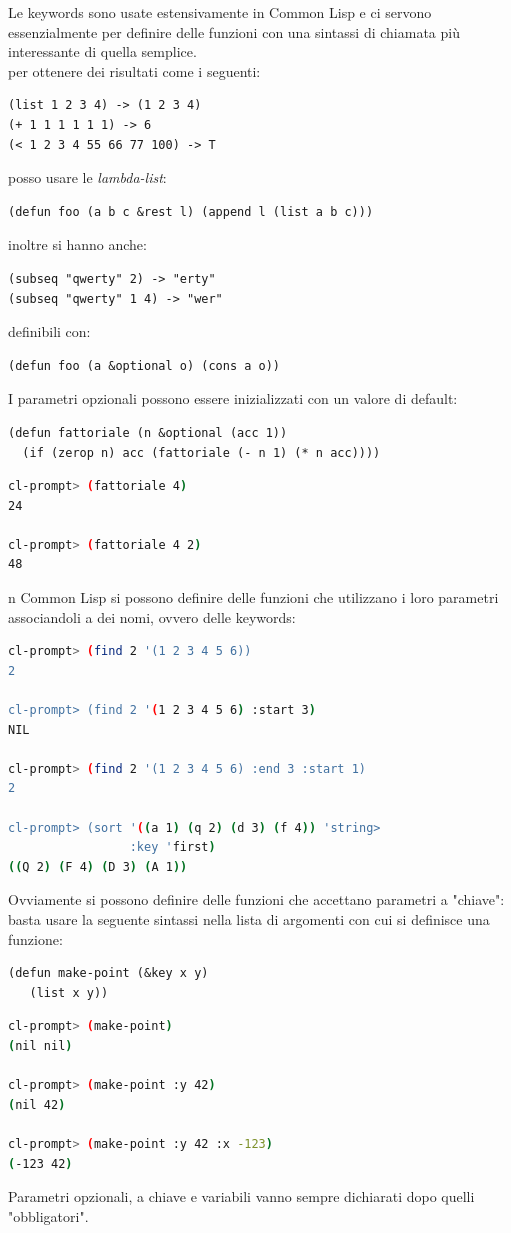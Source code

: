\documentclass[a4paper,12pt, oneside]{book}
\begin{document}
Le keywords sono usate estensivamente in Common Lisp e ci
servono essenzialmente per definire delle funzioni con una
sintassi di chiamata più interessante di quella semplice.\\
per ottenere dei risultati come i seguenti:
\begin{verbatim}
(list 1 2 3 4) -> (1 2 3 4)
(+ 1 1 1 1 1 1) -> 6
(< 1 2 3 4 55 66 77 100) -> T
\end{verbatim}
posso usare le \textit{lambda-list}:
\begin{verbatim}
(defun foo (a b c &rest l) (append l (list a b c)))
\end{verbatim}
inoltre si hanno anche:
\begin{verbatim}
(subseq "qwerty" 2) -> "erty"
(subseq "qwerty" 1 4) -> "wer"
\end{verbatim}
definibili con:
\begin{verbatim}
(defun foo (a &optional o) (cons a o))
\end{verbatim}
I parametri opzionali possono essere inizializzati con un valore di default:
\begin{verbatim}
(defun fattoriale (n &optional (acc 1))
  (if (zerop n) acc (fattoriale (- n 1) (* n acc))))
\end{verbatim}
\begin{shaded}
	\begin{lstlisting}[language=bash]
cl-prompt> (fattoriale 4)
24

cl-prompt> (fattoriale 4 2)
48
\end{lstlisting}
\end{shaded}
n Common Lisp si possono definire delle funzioni che utilizzano i loro parametri
associandoli a dei nomi, ovvero delle keywords:
\begin{shaded}
	\begin{lstlisting}[language=bash]
cl-prompt> (find 2 '(1 2 3 4 5 6))
2

cl-prompt> (find 2 '(1 2 3 4 5 6) :start 3)
NIL

cl-prompt> (find 2 '(1 2 3 4 5 6) :end 3 :start 1)
2

cl-prompt> (sort '((a 1) (q 2) (d 3) (f 4)) 'string>
                 :key 'first)
((Q 2) (F 4) (D 3) (A 1))
\end{lstlisting}
\end{shaded}
Ovviamente si possono definire delle funzioni che accettano parametri a "chiave": basta usare la seguente
sintassi nella lista di argomenti con cui si definisce una funzione:
\begin{verbatim}
(defun make-point (&key x y)
   (list x y))
\end{verbatim}
\begin{shaded}
	\begin{lstlisting}[language=bash]
cl-prompt> (make-point)
(nil nil)

cl-prompt> (make-point :y 42)
(nil 42)

cl-prompt> (make-point :y 42 :x -123)
(-123 42)
\end{lstlisting}
\end{shaded}
Parametri opzionali, a chiave e variabili vanno sempre dichiarati dopo quelli "obbligatori".\\
\end{document}
